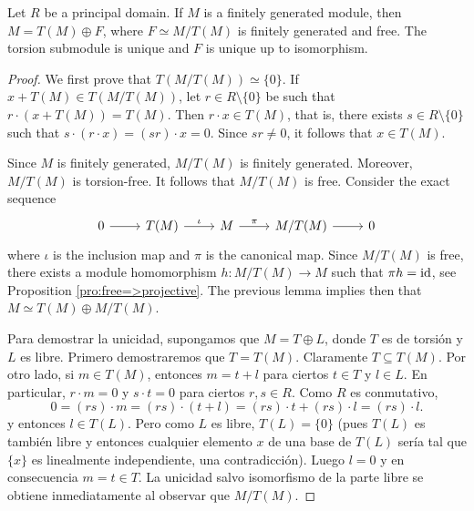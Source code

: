 \begin{theorem}
	\label{thm:free+torsion}
	Let $R$ be a principal domain. 
	If $M$ is a finitely generated module, then $M=T(M)\oplus F$, where
	$F\simeq M/T(M)$ is finitely generated and free. The torsion submodule
	is unique and $F$ is unique up to isomorphism. 
\end{theorem}

\begin{proof}
	We first prove that $T(M/T(M))\simeq\{0\}$. If 
	$x+T(M)\in T(M/T(M))$, let $r\in R\setminus\{0\}$ be such that 
	$r\cdot (x+T(M))=T(M)$. Then $r\cdot x\in T(M)$, that is, there exists 
	$s\in R\setminus\{0\}$ such that $s\cdot (r\cdot x)=(sr)\cdot x=0$. 
	Since $sr\ne 0$, it follows that $x\in T(M)$. 

	Since $M$ is finitely generated, $M/T(M)$ is finitely generated. Moreover, $M/T(M)$ is torsion-free. 
	It follows that $M/T(M)$ is free. Consider the exact sequence 
	\[
		\begin{tikzcd}
			0 & T(M) & M & M/T(M) & 0
			\arrow[from=1-1, to=1-2]
			\arrow["\iota", from=1-2, to=1-3]
			\arrow["\pi", from=1-3, to=1-4]
			\arrow[from=1-4, to=1-5]
	\end{tikzcd}\]
	where $\iota$ is the inclusion map and $\pi$ is the canonical map.  Since
	$M/T(M)$ is free, there exists a module homomorphism $h\colon M/T(M)\to M$
	such that $\pi h=\operatorname{id}$, see Proposition \ref{pro:free=>projective}. 
	The previous lemma implies then that $M\simeq
	T(M)\oplus M/T(M)$. 	
	 
	Para demostrar la unicidad, supongamos que $M=T\oplus L$, donde $T$ es de torsión y $L$ es libre. Primero
	demostraremos que $T=T(M)$. Claramente 
	$T\subseteq T(M)$. Por otro lado, si $m\in T(M)$, entonces $m=t+l$ para ciertos $t\in T$ y $l\in L$. En particular, 
	$r\cdot m=0$ y $s\cdot t=0$ para ciertos $r,s\in R$. Como $R$ es conmutativo, 
	\[
		0=(rs)\cdot m=(rs)\cdot (t+l)=(rs)\cdot t+(rs)\cdot l=(rs)\cdot l.
	\]
	y entonces $l\in T(L)$. Pero 
	como $L$ es libre, $T(L)=\{0\}$ (pues $T(L)$ es también libre y entonces cualquier elemento $x$  
	de una base de $T(L)$ sería tal que $\{x\}$ es linealmente independiente, una contradicción). Luego 
	$l=0$ y en consecuencia $m=t\in T$. La unicidad salvo isomorfismo de la parte libre
	se obtiene inmediatamente al observar que $M/T(M)$. 
\end{proof}



